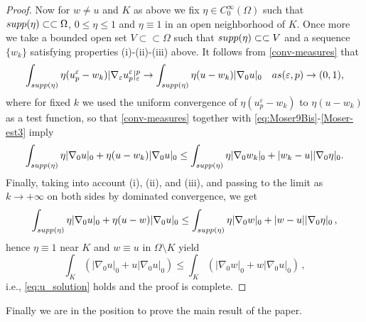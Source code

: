 \documentclass[10pt]{amsart}
\numberwithin{equation}{section}
\theoremstyle{definition}
\begin{document}
\begin{proof}
Now for $w \neq u$ and $K$ as above  we fix $\eta \in C^{\infty}_{0}(\Omega)$ such that $\rm{supp}(\eta)\subset\subset \Omega$, $0 \leq \eta \leq 1$ and $\eta \equiv 1$ in an open neighborhood of $K$. Once more we  take a bounded open set $V \subset \subset \Omega$ such that $\rm{supp}(\eta)\subset\subset V$ and a sequence $\{ w_k\}$ satisfying properties (i)-(ii)-(iii) above.  It follows from \eqref{conv-measures} that
$$\int_{\rm{supp}(\eta)}\eta (u_{p}^{\varepsilon}-w_k) |\nabla_{\varepsilon}u_{p}^{\varepsilon}|_{\varepsilon}^{p} \to \int_{\rm{supp}(\eta)} \eta (u-w_k)|\nabla_{0}u|_{0} \quad \textrm{as } (\varepsilon, p) \to (0,1),$$
\noindent where for fixed $k$ we used the uniform convergence of $\eta (u_{p}^{\varepsilon}-w_k)$ to $\eta (u-w_k)$ as a test function, 
so that \eqref{conv-measures} together with \eqref{eq:Moser9Bis}-\eqref{Moser-est3} imply
\begin{equation*}
\int_{\rm{supp}(\eta)}\eta |\nabla_{0}u|_{0} + \eta (u-w_k)|\nabla_{0}u|_{0}
\leq \int_{\rm{supp}(\eta)} \eta |\nabla_{0}w_k|_{0} + |w_k-u| |\nabla_{0}\eta|_{0}.
\end{equation*}
Finally, taking into account (i), (ii), and (iii), and passing to the limit as $k\to +\infty$ on both sides by dominated convergence, we get
\begin{equation*}
\int_{\rm{supp}(\eta)}\eta |\nabla_{0}u|_{0} + \eta (u-w)|\nabla_{0}u|_{0}
\leq \int_{\rm{supp}(\eta)} \eta |\nabla_{0}w|_{0}+|w-u| |\nabla_{0}\eta|_{0} \, ,
\end{equation*}
\noindent hence $\eta \equiv 1$ near $K$ and $w\equiv u$ in $\Omega \setminus K$ yield
\begin{equation*}
\int_{K} \left(|\nabla_{0}u|_{0} + u|\nabla_{0}u|_{0} \right)\leq \int_{K}\left(|\nabla_{0}w|_{0} + w|\nabla_{0}u|_{0} \right) \, ,
\end{equation*}
i.e., \eqref{eq:u_solution} holds and the proof is complete. 
\end{proof}

Finally we are in the position to prove the main result of the paper.
\end{document}

